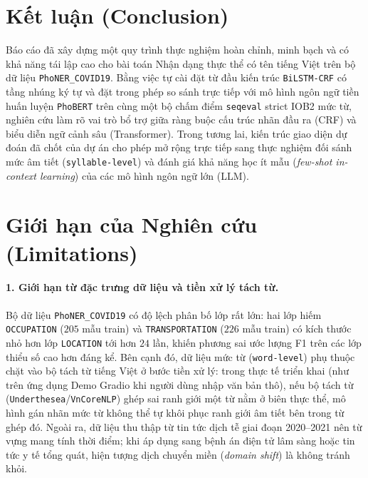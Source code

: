 \documentclass[11pt,a4paper,twocolumn]{article}
\begin{document}
\section{Kết luận (Conclusion)}
\label{sec:conclusion}
Báo cáo đã xây dựng một quy trình thực nghiệm hoàn chỉnh, minh bạch và có khả năng tái lập cao cho bài toán Nhận dạng thực thể có tên tiếng Việt trên bộ dữ liệu \texttt{PhoNER\_COVID19}. Bằng việc tự cài đặt từ đầu kiến trúc \texttt{BiLSTM-CRF} có tầng nhúng ký tự và đặt trong phép so sánh trực tiếp với mô hình ngôn ngữ tiền huấn luyện \texttt{PhoBERT} trên cùng một bộ chấm điểm \texttt{seqeval} strict IOB2 mức từ, nghiên cứu làm rõ vai trò bổ trợ giữa ràng buộc cấu trúc nhãn đầu ra (CRF) và biểu diễn ngữ cảnh sâu (Transformer). Trong tương lai, kiến trúc giao diện dự đoán đã chốt của dự án cho phép mở rộng trực tiếp sang thực nghiệm đối sánh mức âm tiết (\texttt{syllable-level}) và đánh giá khả năng học ít mẫu (\textit{few-shot in-context learning}) của các mô hình ngôn ngữ lớn (LLM).

\section*{Giới hạn của Nghiên cứu (Limitations)}
\label{sec:limitations}

\paragraph{1. Giới hạn từ đặc trưng dữ liệu và tiền xử lý tách từ.}
Bộ dữ liệu \texttt{PhoNER\_COVID19} có độ lệch phân bố lớp rất lớn: hai lớp hiếm \texttt{OCCUPATION} ($205$ mẫu train) và \texttt{TRANSPORTATION} ($226$ mẫu train) có kích thước nhỏ hơn lớp \texttt{LOCATION} tới hơn $24$ lần, khiến phương sai ước lượng F1 trên các lớp thiểu số cao hơn đáng kể. Bên cạnh đó, dữ liệu mức từ (\texttt{word-level}) phụ thuộc chặt vào bộ tách từ tiếng Việt ở bước tiền xử lý: trong thực tế triển khai (như trên ứng dụng Demo Gradio khi người dùng nhập văn bản thô), nếu bộ tách từ (\texttt{Underthesea}/\texttt{VnCoreNLP}) ghép sai ranh giới một từ nằm ở biên thực thể, mô hình gán nhãn mức từ không thể tự khôi phục ranh giới âm tiết bên trong từ ghép đó. Ngoài ra, dữ liệu thu thập từ tin tức dịch tễ giai đoạn 2020--2021 nên từ vựng mang tính thời điểm; khi áp dụng sang bệnh án điện tử lâm sàng hoặc tin tức y tế tổng quát, hiện tượng dịch chuyển miền (\textit{domain shift}) là không tránh khỏi.
\end{document}
